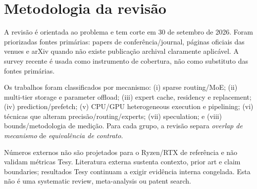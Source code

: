 \section{Metodologia da revisão}
A revisão é orientada ao problema e tem corte em 30 de setembro de 2026. Foram priorizadas fontes primárias: papers de conferência/journal, páginas oficiais das venues e arXiv quando não existe publicação archival claramente aplicável. A survey recente \cite{liu2026survey} é usada como instrumento de cobertura, não como substituto das fontes primárias.

Os trabalhos foram classificados por mecanismo: (i) sparse routing/MoE; (ii) multi-tier storage e parameter offload; (iii) expert cache, residency e replacement; (iv) prediction/prefetch; (v) CPU/GPU heterogeneous execution e pipelining; (vi) técnicas que alteram precisão/routing/experts; (vii) speculation; e (viii) bounds/metodologia de medição. Para cada grupo, a revisão separa \emph{overlap de mecanismo} de \emph{equivalência de contrato}.

Números externos não são projetados para o Ryzen/RTX de referência e não validam métricas Tesy. Literatura externa sustenta contexto, prior art e claim boundaries; resultados Tesy continuam a exigir evidência interna congelada. Esta não é uma systematic review, meta-analysis ou patent search.
